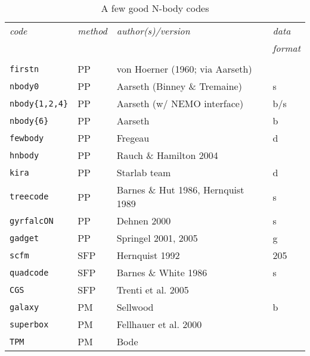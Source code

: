\begin{center}
\begin{table}[h]
\caption{A few good N-body codes}
\begin{tabular}{||l|l|l|l||}

\hline 
{\it code} & {\it method} & {\it author(s)/version}  & {\it data} \\
       &&& {\it format} \\
\hline &&& \\

{\tt firstn} & PP & von Hoerner (1960; via Aarseth)  & \\

{\tt nbody0} & PP & Aarseth (Binney \& Tremaine) & s \\

{\tt nbody\{1,2,4\}} & PP & Aarseth (w/ NEMO interface) & b/s\\

{\tt nbody\{6\}} & PP &  Aarseth  & b \\

{\tt fewbody} & PP & Fregeau   & d \\

{\tt hnbody}  & PP & Rauch \& Hamilton 2004 & \\

{\tt kira} & PP & Starlab team & d \\

{\tt treecode} & PP & Barnes \& Hut 1986, Hernquist 1989 & s \\

{\tt gyrfalcON} & PP & Dehnen 2000 & s \\


{\tt gadget} & PP & Springel 2001, 2005  & g \\

{\tt scfm} & SFP & Hernquist 1992 & 205 \\

{\tt quadcode} & SFP & Barnes \& White 1986 & s \\

{\tt CGS} & SFP &  Trenti et al. 2005 & \\

{\tt galaxy} & PM & Sellwood  & b \\

{\tt superbox} & PM &  Fellhauer et al. 2000 & \\

{\tt TPM} & PM &  Bode & \\


\hline 

\end{tabular}
\label{t:codes}
\end{table}
\end{center}

